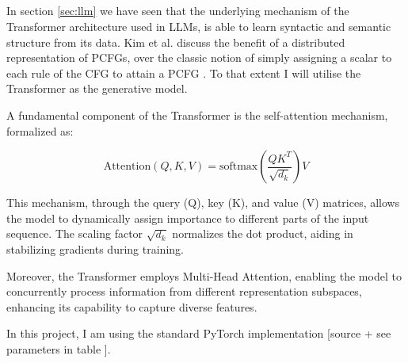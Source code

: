 \subsection{}



\subsubsection{}
In section \ref{sec:llm} we have seen that the underlying mechanism of the Transformer architecture used in LLMs, is able to learn syntactic and semantic structure from its data.
Kim et al. discuss the benefit of a distributed representation of PCFGs, over the classic notion of simply assigning a scalar to each rule of the CFG to attain a PCFG  \cite{kim_compound_2019}. To that extent I will utilise the Transformer as the generative model.

A fundamental component of the Transformer is the self-attention mechanism, formalized as:

\begin{equation}
    \text{Attention}(Q, K, V) = \text{softmax}(\frac{QK^T}{\sqrt{d_k}})V
\end{equation}

This mechanism, through the query (Q), key (K), and value (V) matrices, allows the model to dynamically assign importance to different parts of the input sequence. The scaling factor $\sqrt{d_k}$ normalizes the dot product, aiding in stabilizing gradients during training.

Moreover, the Transformer employs Multi-Head Attention, enabling the model to concurrently process information from different representation subspaces, enhancing its capability to capture diverse features. 

In this project, I am using the standard PyTorch implementation [source + see parameters in table ].

